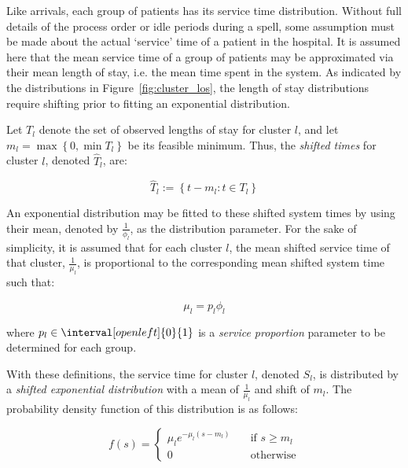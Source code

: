 Like arrivals, each group of patients has its service time distribution.
Without full details of the process order or idle periods during a spell, some
assumption must be made about the actual `service' time of a patient in the
hospital. It is assumed here that the mean service time of a group of patients
may be approximated via their mean length of stay, i.e. the mean time spent in
the system. As indicated by the distributions in Figure~\ref{fig:cluster_los},
the length of stay distributions require shifting prior to fitting an
exponential distribution.

Let \(T_l\) denote the set of observed lengths of stay for cluster \(l\), and
let \(m_l = \max \left\{0, \min T_l\right\}\) be its feasible minimum. Thus, the
\emph{shifted times} for cluster \(l\), denoted \(\widehat T_l\), are:

\begin{equation}\label{eq:shifted}
    \widehat T_l := \left\{t - m_l : t \in T_l\right\}
\end{equation}

An exponential distribution may be fitted to these shifted system times by
using their mean, denoted by \(\frac{1}{\phi_l}\), as the distribution
parameter. For the sake of simplicity, it is assumed that for each cluster
\(l\), the mean shifted service time of that cluster, \(\frac{1}{\mu_l}\), is
proportional to the corresponding mean shifted system time such that:

\begin{equation}\label{eq:shifted_services}
    \mu_l = p_l \phi_l
\end{equation}

\noindent where \(p_l \in \interval[open left]{0}{1}\) is a {\slshape service
proportion} parameter to be determined for each group.

With these definitions, the service time for cluster \(l\), denoted \(S_l\), is
distributed by a {\slshape shifted exponential distribution} with a mean of
\(\frac{1}{\mu_l}\) and shift of \(m_l\). The probability density function
of this distribution is as follows:

\begin{equation}\label{eq:shifted_pdf}
    f(s) = \begin{cases}
        \mu_l e^{-\mu_l (s - m_l)} & \quad \text{if \(s \ge m_l\)}\\
        0 & \quad \text{otherwise}
    \end{cases}
\end{equation}

